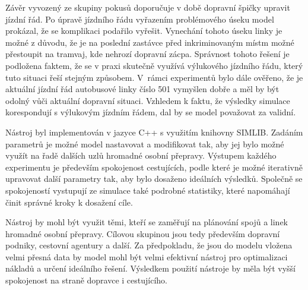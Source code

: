 \documentclass[a4paper]{article}
\begin{document}
            Závěr vyvozený ze skupiny pokusů doporučuje v době dopravní špičky upravit jízdní řád. Po úpravě jízdního řádu vyřazením problémového úseku model prokázal, že se komplikaci podařilo vyřešit. Vynechání tohoto úseku linky je možné z důvodu, že je na poslední zastávce před inkriminovaným místm možné přestoupit na tramvaj, kde nehrozí dopravní zácpa. Správnost tohoto řešení je podložena faktem, že se v praxi skutečně využívá výlukového jízdního řádu, který tuto situaci řeší stejným způsobem. V~rámci experimentů bylo dále ověřeno, že je aktuální jízdní řád autobusové linky číslo 501 vymyšlen dobře a měl by být odolný vůči aktuální dopravní situaci. Vzhledem k faktu, že výsledky simulace korespondují s výlukovým jízdním řádem, dal by se model považovat za validní.

 
     		Nástroj byl implementován v jazyce C++ s využitím knihovny SIMLIB. Zadáním parametrů je možné model nastavovat a modifikovat tak, aby jej bylo možné využít na řadě dalších uzlů hromadné osobní přepravy. Výstupem každého experimentu je především spokojenost cestujících, podle které je možné iterativně upravovat další parametry tak, aby bylo dosaženo ideálních výsledků. Společně se spokojeností vystupují ze simulace také podrobné statistiky, které napomáhají činit správné kroky k dosažení cíle.
			

			Nástroj by mohl být využit těmi, kteří se zaměřují na plánování spojů a linek hromadné osobní přepravy. Cílovou skupinou jsou tedy především dopravní podniky, cestovní agentury a další. Za předpokladu, že jsou do modelu vložena velmi přesná data by model mohl být velmi efektivní nástroj pro optimalizaci nákladů a určení ideálního řešení. Výsledkem použití nástroje by měla být vyšší spokojenost na straně dopravce i cestujícího.
            


    \newpage

    \renewcommand{\refname}{Použitá literatura}
    
    
\end{document}
